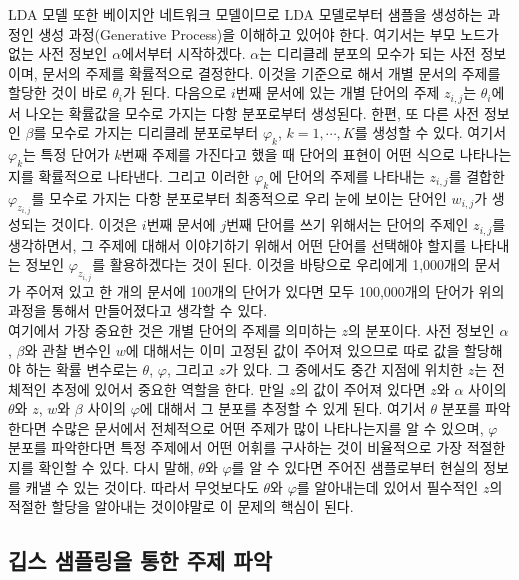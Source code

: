 \documentclass[a4paper]{oblivoir}
\begin{document}
LDA 모델 또한 베이지안 네트워크 모델이므로 LDA 모델로부터 샘플을 생성하는 과정인 생성 과정(Generative Process)을 이해하고 있어야 한다. 여기서는 부모 노드가 없는 사전 정보인 $\alpha$에서부터 시작하겠다. $\alpha$는 디리클레 분포의 모수가 되는 사전 정보이며, 문서의 주제를 확률적으로 결정한다. 이것을 기준으로 해서 개별 문서의 주제를 할당한 것이 바로 $\theta_{i}$가 된다. 다음으로 $i$번째 문서에 있는 개별 단어의 주제 $z_{i,j}$는 $\theta_{i}$에서 나오는 확률값을 모수로 가지는 다항 분포로부터 생성된다. 한편, 또 다른 사전 정보인 $\beta$를 모수로 가지는 디리클레 분포로부터 $\varphi_{k}$, $k=1,\cdots,K$를 생성할 수 있다. 여기서 $\varphi_{k}$는 특정 단어가 $k$번째 주제를 가진다고 했을 때 단어의 표현이 어떤 식으로 나타나는지를 확률적으로 나타낸다. 그리고 이러한 $\varphi_{k}$에 단어의 주제를 나타내는 $z_{i,j}$를 결합한 $\varphi_{z_{i,j}}$를 모수로 가지는 다항 분포로부터 최종적으로 우리 눈에 보이는 단어인 $w_{i,j}$가 생성되는 것이다. 이것은 $i$번째 문서에 $j$번째 단어를 쓰기 위해서는 단어의 주제인 $z_{i,j}$를 생각하면서, 그 주제에 대해서 이야기하기 위해서 어떤 단어를 선택해야 할지를 나타내는 정보인 $\varphi_{z_{i,j}}$를 활용하겠다는 것이 된다. 이것을 바탕으로 우리에게 1,000개의 문서가 주어져 있고 한 개의 문서에 100개의 단어가 있다면 모두 100,000개의 단어가 위의 과정을 통해서 만들어졌다고 생각할 수 있다. \\ 

여기에서 가장 중요한 것은 개별 단어의 주제를 의미하는 $z$의 분포이다. 사전 정보인 $\alpha$, $\beta$와 관찰 변수인 $w$에 대해서는 이미 고정된 값이 주어져 있으므로 따로 값을 할당해야 하는 확률 변수로는 $\theta$, $\varphi$, 그리고 $z$가 있다. 그 중에서도 중간 지점에 위치한 $z$는 전체적인 추정에 있어서 중요한 역할을 한다. 만일 $z$의 값이 주어져 있다면 $z$와 $\alpha$ 사이의 $\theta$와 $z$, $w$와 $\beta$ 사이의 $\varphi$에 대해서 그 분포를 추정할 수 있게 된다. 여기서 $\theta$ 분포를 파악한다면 수많은 문서에서 전체적으로 어떤 주제가 많이 나타나는지를 알 수 있으며, $\varphi$ 분포를 파악한다면 특정 주제에서 어떤 어휘를 구사하는 것이 비율적으로 가장 적절한지를 확인할 수 있다. 다시 말해, $\theta$와 $\varphi$를 알 수 있다면 주어진 샘플로부터 현실의 정보를 캐낼 수 있는 것이다. 따라서 무엇보다도 $\theta$와 $\varphi$를 알아내는데 있어서 필수적인 $z$의 적절한 할당을 알아내는 것이야말로 이 문제의 핵심이 된다. \\         

\subsection{깁스 샘플링을 통한 주제 파악}
\end{document}
